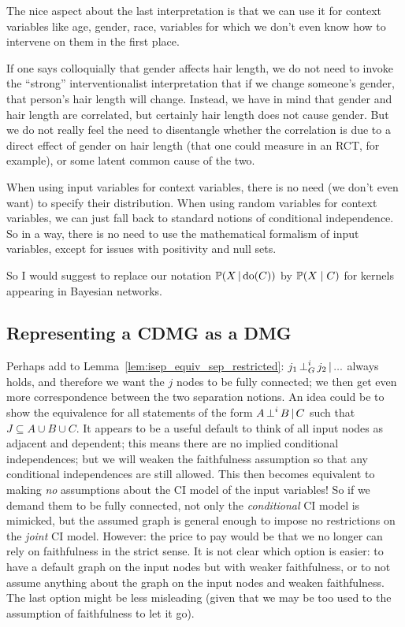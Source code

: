 The nice aspect about the last interpretation is that we can use it for context variables like age, gender, race, variables for which we don't even know how to intervene on them in the first place.

If one says colloquially that gender affects hair length, we do not need to invoke the ``strong'' interventionalist interpretation that if we change someone's gender, that person's hair length will change.
Instead, we have in mind that gender and hair length are correlated, but certainly hair length does not cause gender.
But we do not really feel the need to disentangle whether the correlation is due to a direct effect of gender on hair length (that one could measure in an RCT, for example), or some latent common cause of the two.

When using input variables for context variables, there is no need (we don't even want) to specify their distribution.
When using random variables for context variables, we can just fall back to standard notions of conditional independence.
So in a way, there is no need to use the mathematical formalism of input variables, except for issues with positivity and null sets.

So I would suggest to replace our notation $\mathbb{P}(X \operatorname*{|} \operatorname{do}(C))$ by $\mathbb{P}(X \mid C)$ for kernels appearing in Bayesian networks.


\subsection{Representing a CDMG as a DMG}

Perhaps add to Lemma~\ref{lem:isep_equiv_sep_restricted}: $j_1 \operatorname*{\perp}^i_G j_2 \operatorname*{|} ...$ always holds, and therefore we want the $j$ nodes to be fully connected; we then get even more correspondence between the two separation notions. An idea could be to show the equivalence for all statements of the form $A \operatorname*{\perp}^i B \operatorname*{|} C$ such that $J \subseteq A \cup B \cup C$. It appears to be a useful default to think of all input nodes as adjacent and dependent; this means there are no implied conditional independences; but we will weaken the faithfulness assumption so that any conditional independences are still allowed. This then becomes equivalent to making \emph{no} assumptions about the CI model of the input variables! So if we demand them to be fully connected, not only the \emph{conditional} CI model is mimicked, but the assumed graph is general enough to impose no restrictions on the \emph{joint} CI model. However: the price to pay would be that we no longer can rely on faithfulness in the strict sense. It is not clear which option is easier: to have a default graph on the input nodes but with weaker faithfulness, or to not assume anything about the graph on the input nodes and weaken faithfulness. The last option might be less misleading (given that we may be too used to the assumption of faithfulness to let it go).

